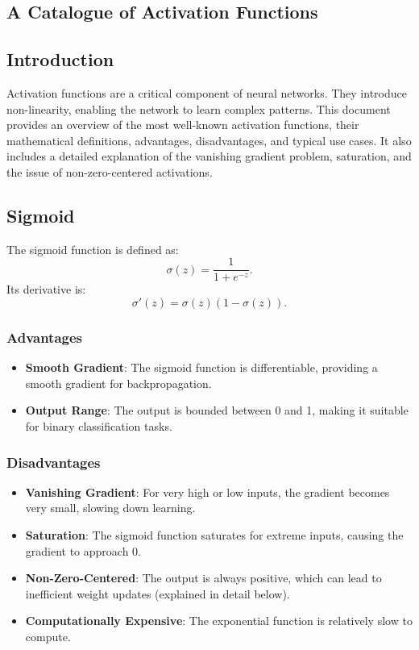 \begin{notechapter}
\chapter{A Catalogue of Activation Functions}\label{ch:activation-catalogue}

\section{Introduction}
Activation functions are a critical component of neural networks. They introduce
non-linearity, enabling the network to learn complex patterns. This document
provides an overview of the most well-known activation functions, their
mathematical definitions, advantages, disadvantages, and typical use cases. It
also includes a detailed explanation of the vanishing gradient problem,
saturation, and the issue of non-zero-centered activations.

\section{Sigmoid}
The sigmoid function is defined as:
\[
\sigma(z) = \frac{1}{1 + e^{-z}}.
\]
Its derivative is:
\[
\sigma'(z) = \sigma(z) (1 - \sigma(z)).
\]

\subsection{Advantages}
\begin{itemize}[leftmargin=*]
    \item \textbf{Smooth Gradient}: The sigmoid function is differentiable,
    providing a smooth gradient for backpropagation.
    \item \textbf{Output Range}: The output is bounded between 0 and 1, making it
    suitable for binary classification tasks.
\end{itemize}

\subsection{Disadvantages}
\begin{itemize}[leftmargin=*]
    \item \textbf{Vanishing Gradient}: For very high or low inputs, the gradient
    becomes very small, slowing down learning.
    \item \textbf{Saturation}: The sigmoid function saturates for extreme inputs,
    causing the gradient to approach 0.
    \item \textbf{Non-Zero-Centered}: The output is always positive, which can
    lead to inefficient weight updates (explained in detail below).
    \item \textbf{Computationally Expensive}: The exponential function is
    relatively slow to compute.
\end{itemize}


\end{notechapter}
